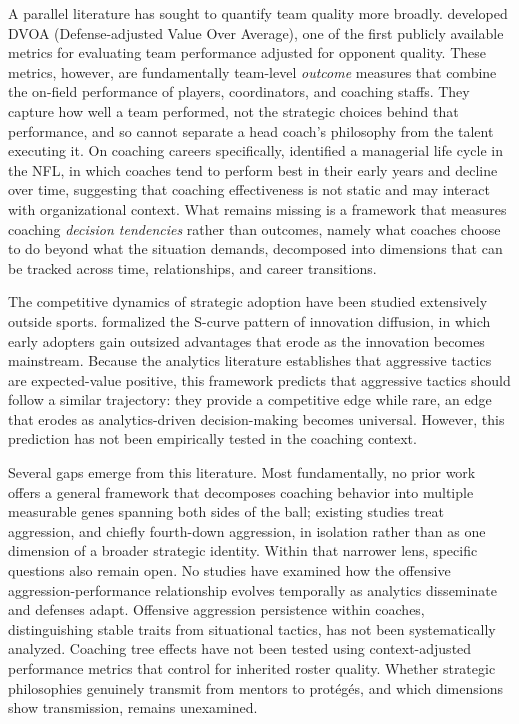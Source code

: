 \documentclass[USenglish]{article}
\theoremstyle{dgthm}
\theoremstyle{dgdef}
\begin{document}
A parallel literature has sought to quantify team quality more broadly. \citet{schatz2003} developed DVOA (Defense-adjusted Value Over Average), one of the first publicly available metrics for evaluating team performance adjusted for opponent quality. These metrics, however, are fundamentally team-level \emph{outcome} measures that combine the on-field performance of players, coordinators, and coaching staffs. They capture how well a team performed, not the strategic choices behind that performance, and so cannot separate a head coach's philosophy from the talent executing it. On coaching careers specifically, \citet{goff2006} identified a managerial life cycle in the NFL, in which coaches tend to perform best in their early years and decline over time, suggesting that coaching effectiveness is not static and may interact with organizational context. What remains missing is a framework that measures coaching \emph{decision tendencies} rather than outcomes, namely what coaches choose to do beyond what the situation demands, decomposed into dimensions that can be tracked across time, relationships, and career transitions.

The competitive dynamics of strategic adoption have been studied extensively outside sports. \citet{rogers2007} formalized the S-curve pattern of innovation diffusion, in which early adopters gain outsized advantages that erode as the innovation becomes mainstream. Because the analytics literature establishes that aggressive tactics are expected-value positive, this framework predicts that aggressive tactics should follow a similar trajectory: they provide a competitive edge while rare, an edge that erodes as analytics-driven decision-making becomes universal. However, this prediction has not been empirically tested in the coaching context.

Several gaps emerge from this literature. Most fundamentally, no prior work offers a general framework that decomposes coaching behavior into multiple measurable genes spanning both sides of the ball; existing studies treat aggression, and chiefly fourth-down aggression, in isolation rather than as one dimension of a broader strategic identity. Within that narrower lens, specific questions also remain open. No studies have examined how the offensive aggression-performance relationship evolves temporally as analytics disseminate and defenses adapt. Offensive aggression persistence within coaches, distinguishing stable traits from situational tactics, has not been systematically analyzed. Coaching tree effects have not been tested using context-adjusted performance metrics that control for inherited roster quality. Whether strategic philosophies genuinely transmit from mentors to prot\'{e}g\'{e}s, and which dimensions show transmission, remains unexamined.
\end{document}
